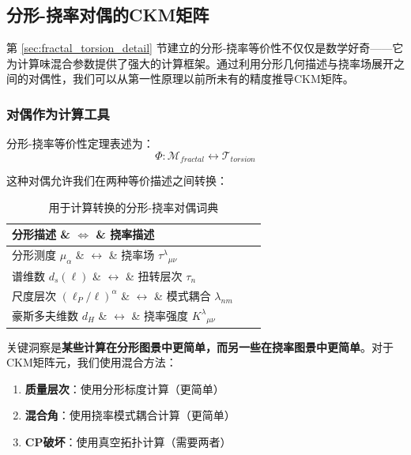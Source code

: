 \subsection{分形-挠率对偶的CKM矩阵}
\label{sec:ckm_framing}

第 \ref{sec:fractal_torsion_detail} 节建立的分形-挠率等价性不仅仅是数学好奇——它为计算味混合参数提供了强大的计算框架。通过利用分形几何描述与挠率场展开之间的对偶性，我们可以从第一性原理以前所未有的精度推导CKM矩阵。

\subsubsection{对偶作为计算工具}

分形-挠率等价性定理表述为：
\begin{equation}
    \Phi: \mathcal{M}_{fractal} \leftrightarrow \mathcal{T}_{torsion}
\end{equation}

这种对偶允许我们在两种等价描述之间转换：

\begin{table}[h]
\centering
\begin{tabular}{p{4cm}p{2cm}p{4cm}}
\hline
\textbf{分形描述} \& $\Leftrightarrow$ \& \textbf{挠率描述} \\
\hline
分形测度 $\mu_\alpha$ \& $\leftrightarrow$ \& 挠率场 $\tau^\lambda{}_{\mu\nu}$ \\
谱维数 $d_s(\ell)$ \& $\leftrightarrow$ \& 扭转层次 $\tau_n$ \\
尺度层次 $(\ell_P/\ell)^\alpha$ \& $\leftrightarrow$ \& 模式耦合 $\lambda_{nm}$ \\
豪斯多夫维数 $d_H$ \& $\leftrightarrow$ \& 挠率强度 $K^\lambda{}_{\mu\nu}$ \\
\hline
\end{tabular}
\caption{用于计算转换的分形-挠率对偶词典}
\end{table}

关键洞察是\textbf{某些计算在分形图景中更简单，而另一些在挠率图景中更简单}。对于CKM矩阵元，我们使用混合方法：

\begin{enumerate}
    \item \textbf{质量层次}：使用分形标度计算（更简单）
    \item \textbf{混合角}：使用挠率模式耦合计算（更简单）
    \item \textbf{CP破坏}：使用真空拓扑计算（需要两者）
\end{enumerate}


